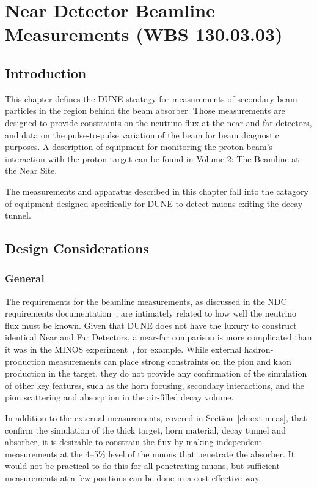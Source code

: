 \chapter{Near Detector Beamline Measurements (WBS 130.03.03)}
\label{ch:nd-blm}


\section{Introduction}
\label{sec:nd-blm-intro}

This chapter defines the DUNE strategy for measurements of secondary
beam particles in the region behind the beam absorber. 
Those measurements are designed to provide constraints 
on the neutrino flux at the near and far
detectors, and data on the pulse-to-pulse variation
of the beam for beam diagnostic purposes. A description of equipment
for monitoring the proton beam's interaction with the proton target
can be found in Volume 2: The Beamline at the Near Site. 

The measurements and apparatus described in this chapter fall into
the catagory of equipment designed specifically for DUNE to
detect muons exiting the decay tunnel. 

\section{Design Considerations}
\label{sec:nd-blm-design}

\subsection{General}
The requirements for the beamline measurements, 
as discussed in the NDC requirements documentation~\cite{nd_requirements_doc}, are intimately related to how well the neutrino flux must be known.
Given that DUNE does not have the luxury to construct identical Near and Far Detectors, 
a near-far comparison is more complicated than it was in
the MINOS experiment~\cite{gnumi-validation}, for example.   
While external hadron-production measurements can place strong constraints on the pion and kaon production in the target,
they do not provide any confirmation of the simulation of other key features, such as the horn focusing, secondary interactions, and the pion scattering and absorption in the air-filled decay volume. 

In addition to the external measurements, covered in Section~\ref{ch:ext-meas}, 
that confirm
the simulation of the thick target, horn material, decay tunnel and
absorber, it is desirable to constrain the flux by making independent
measurements at the 4--5\%
level of the muons that penetrate the absorber. It would not be practical to do this for all penetrating
muons, but sufficient measurements at a few positions can be done in a 
cost-effective way. 

